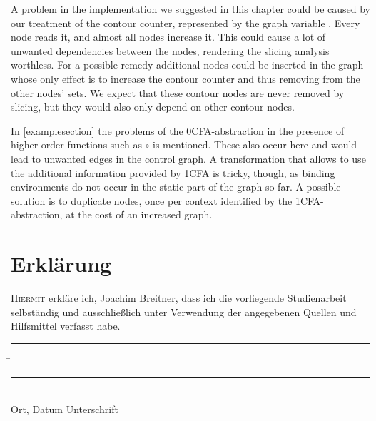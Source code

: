 \documentclass[a4paper,parskip=half,BCOR=8mm,DIV=calc,12pt]{scrbook}
\begin{document}
A problem in the implementation we suggested in this chapter could be caused by our treatment of the contour counter, represented by the graph variable . Every node reads it, and almost all nodes increase it. This could cause a lot of unwanted dependencies between the nodes, rendering the slicing analysis worthless. For a possible remedy additional nodes could be inserted in the graph whose only effect is to increase the contour counter and thus removing  from the other nodes’  sets. We expect that these contour nodes are never removed by slicing, but they would also only depend on other contour nodes.

In \cref{examplesection} the problems of the 0CFA-abstraction in the presence of higher order functions such as $\circ$ is mentioned. These also occur here and would lead to unwanted edges in the control graph. A transformation that allows to use the additional information provided by 1CFA is tricky, though, as binding environments do not occur in the static part of the graph so far. A possible solution is to duplicate nodes, once per context identified by the 1CFA-abstraction, at the cost of an increased graph.


\appendix

{
\raggedright

}

\renewcommand{\cleardoublepage}{\vfill}
\chapter*{Erklärung}

\lettrine H{iermit} erkläre ich, Joachim Breitner, dass ich die vorliegende Studienarbeit selb\-ständig
und ausschließlich unter Verwendung der angegebenen Quellen und Hilfsmittel verfasst
habe.
\vspace{20mm}
\begin{tabbing}
\rule{4cm}{.4pt}\hspace{1cm} \= \rule{7cm}{.4pt} \\
Ort, Datum \> Unterschrift
\end{tabbing}
\end{document}
